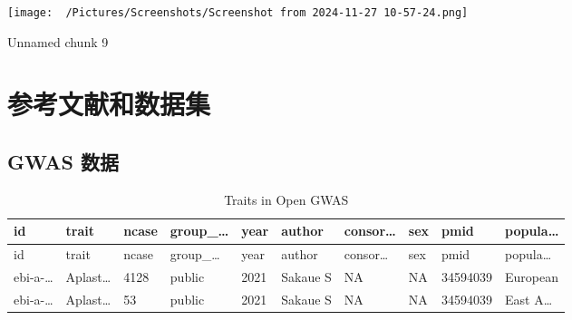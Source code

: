 \documentclass[
]{article}
\begin{document}
\begin{center}\vspace{1.5cm}\end{center}
\def\@captype{figure}
\begin{center}
\texttt{[image: ~/Pictures/Screenshots/Screenshot from 2024-11-27 10-57-24.png]}
\caption{Unnamed chunk 9}\label{fig:unnamed-chunk-9}
\end{center}

\begin{center}\vspace{1.5cm}\end{center}

\hypertarget{workflow}{%
\section{参考文献和数据集}\label{workflow}}

\hypertarget{gwas-ux6570ux636e}{%
\subsection{GWAS 数据}\label{gwas-ux6570ux636e}}

\begin{center}\vspace{1.5cm}\end{center}

\begin{longtable}[]{@{}llllllllll@{}}
\caption{\label{tab:Traits-in-Open-GWAS}Traits in Open GWAS}\tabularnewline
\toprule
id & trait & ncase & group\_\ldots{} & year & author & consor\ldots{} & sex & pmid & popula\ldots{}\tabularnewline
\midrule
\endfirsthead
\toprule
id & trait & ncase & group\_\ldots{} & year & author & consor\ldots{} & sex & pmid & popula\ldots{}\tabularnewline
\midrule
\endhead
ebi-a-\ldots{} & Aplast\ldots{} & 4128 & public & 2021 & Sakaue S & NA & NA & 34594039 & European\tabularnewline
ebi-a-\ldots{} & Aplast\ldots{} & 53 & public & 2021 & Sakaue S & NA & NA & 34594039 & East A\ldots{}\tabularnewline
\bottomrule
\end{longtable}

\begin{center}\vspace{1.5cm}\end{center}
\end{document}
